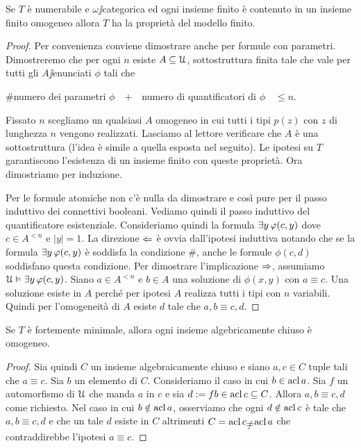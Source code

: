 \begin{lemma}\label{lem_zilbergiocattolo} Se $T$ \`e numerabile e $\omega\jj$categorica ed ogni insieme finito \`e contenuto in un insieme finito omogeneo allora $T$ ha la propriet\`a del modello finito.
\end{lemma}
\begin{proof}
Per convenienza conviene dimostrare  anche per formule con parametri. Dimostreremo che per ogni $n$ esiste $A\subseteq\EuScript U$, sottostruttura finita tale che  vale per tutti gli $A\jj$enunciati $\phi$ tali che

$\#$\hfil numero dei parametri $\phi$\ \  $+$\ \  numero di quantificatori di $\phi$\ \ $\le n$.

Fissato $n$ scegliamo un qualsiasi $A$ omogeneo in cui tutti i tipi $p(z)$ con $z$ di lunghezza $n$ vengono realizzati. Lasciamo al lettore verificare che $A$ \`e una sottostruttura (l'idea \`e simile a quella esposta nel seguito). Le ipotesi su $T$ garantiscono l'esistenza di un insieme finito con queste propriet\`a. Ora dimostriamo  per induzione.

Per le formule atomiche non c'\`e nulla da dimostrare e cos\`i pure per il passo induttivo dei connettivi booleani. Vediamo quindi il passo induttivo del quantificatore esistenziale. Consideriamo quindi la formula $\exists y\,\varphi(c,y)$ dove $c\in A^{<n}$ e $|y|=1$. La direzione $\Leftarrow$ \`e ovvia dall'ipotesi induttiva notando che se la formula $\exists y\,\varphi(c,y)$ \`e soddisfa la condizione $\#$, anche le formule $\phi(c,d)$ soddisfano questa condizione. Per dimostrare l'implicazione $\Rightarrow$, assumiamo $\EuScript U\vDash\exists y\, \varphi(c,y)$. Siano $a\in A^{<n}$ e $b\in A$ una soluzione di $\phi(x,y)$ con $a\equiv c$. Una soluzione esiste in $A$ perch\'e per ipotesi $A$ realizza tutti i tipi con $n$ variabili. Quindi per l'omogeneit\`a di $A$ esiste $d$ tale che $a,b\equiv c,d$.
\end{proof}

\begin{proposition}\label{prop_zilbergiocattolo} Se $T$ \`e fortemente minimale, allora ogni insieme algebricamente chiuso \`e omogeneo.
\end{proposition}
\begin{proof}
Sia quindi $C$ un insieme algebraicamente chiuso e siano $a,c\in C$ tuple tali che $a\equiv c$. Sia $b$ un elemento di $C$. Consideriamo il caso in cui $b\in\mathop{\rm acl} a$. Sia $f$ un automorfismo di $\EuScript U$ che manda $a$ in $c$ e sia $d:=fb\in\mathop{\rm acl} c\subseteq  C$.  Allora $a,b\equiv c,d$ come richiesto. Nel caso in cui $b\notin\mathop{\rm acl} a$, osserviamo che ogni $d\notin\mathop{\rm acl} c$ \`e tale che $a,b\equiv c,d$ e che un tale $d$ esiste in $C$ altrimenti $C=\acl c\neq\acl a$ che contraddirebbe l'ipotesi $a\equiv c$.
\end{proof}

